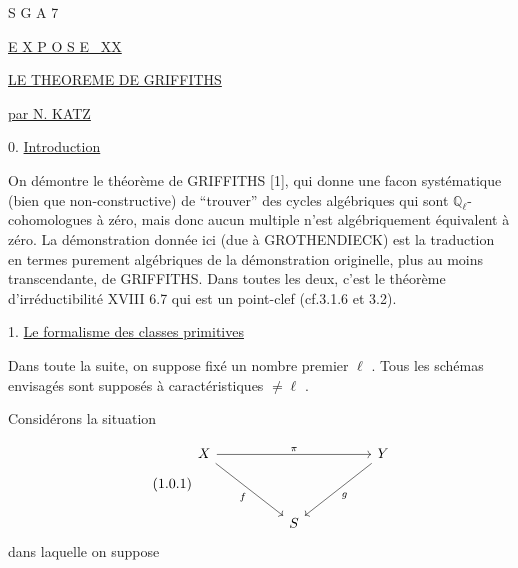 


S G A 7


\underline{E X P O S E \ XX}


\underline{LE THEOREME DE GRIFFITHS}


\underline{par N. KATZ}


0. \underline{Introduction}

On démontre le théorème de GRIFFITHS [1], qui donne une facon systématique (bien que non-constructive) de ``trouver'' des cycles algébriques qui sont $\mathbb{Q}_\ell$-cohomologues à zéro, mais donc aucun multiple n'est algébriquement équivalent à zéro. La démonstration donnée ici (due à GROTHENDIECK) est la traduction en termes purement algébriques de la démonstration originelle, plus au moins transcendante, de GRIFFITHS. Dans toutes les deux, c'est le théorème d'irréductibilité XVIII 6.7 qui est un point-clef (cf.3.1.6 et 3.2).


1. \underline{Le formalisme des classes primitives}

Dans toute la suite, on suppose fixé un nombre premier $\ell$ . Tous les schémas envisagés sont supposés à caractéristiques $\neq \ell$ .

Considérons la situation

\begin{equation}\tag{1.0.1}
\begin{tikzcd}[column sep=huge, row sep=huge]
X \arrow[rr, "\pi"] \arrow[dr, "f"'] & {} & Y \arrow[dl, "g"] \\
{} & S &
{} \end{tikzcd}
\end{equation}
dans laquelle on suppose 


